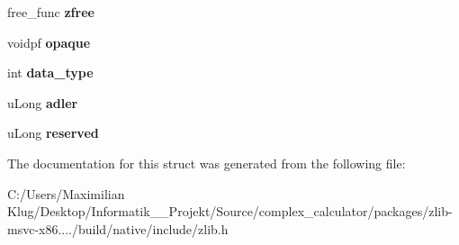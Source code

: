 \begin{DoxyCompactItemize}
\mbox{\label{structz__stream__s_a89eb750ade7f4f0b56bfdadf13344982}} 
free\+\_\+func {\bfseries zfree}
\item 
\mbox{\label{structz__stream__s_ab72467f908d2ce65d5b42ee6556ef8bb}} 
voidpf {\bfseries opaque}
\item 
\mbox{\label{structz__stream__s_a9d8f63877d7639a8bca60f9fc3704fc4}} 
int {\bfseries data\+\_\+type}
\item 
\mbox{\label{structz__stream__s_ade2217fe31e671be1257731883201223}} 
u\+Long {\bfseries adler}
\item 
\mbox{\label{structz__stream__s_add73791dd19b49c9c68f3f3d328c37db}} 
u\+Long {\bfseries reserved}
\end{DoxyCompactItemize}


The documentation for this struct was generated from the following file\+:\begin{DoxyCompactItemize}
\item 
C\+:/\+Users/\+Maximilian Klug/\+Desktop/\+Informatik\+\_\+\_\+\+Projekt/\+Source/complex\+\_\+calculator/packages/zlib-\/msvc-\/x86..../build/native/include/zlib.\+h\end{DoxyCompactItemize}
